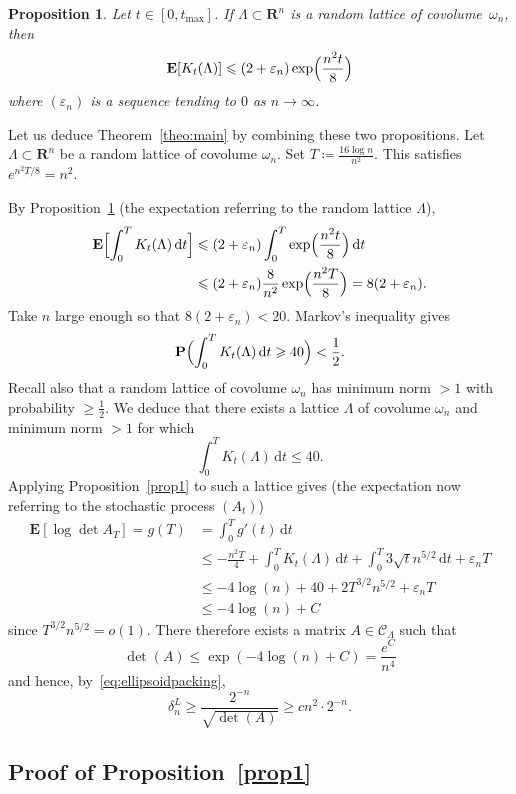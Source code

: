 \documentclass[12pt]{amsart}
\newcommand{\R}{\mathbf{R}}
\newcommand{\E}{\mathbf{E}}
\newcommand{\e}{\varepsilon}
\renewcommand{\P}{\mathbf{P}}
\renewcommand{\leq}{\leqslant}
\renewcommand{\geq}{\geqslant}
\theoremstyle{plain}
\newtheorem{proposition}{Proposition}
\theoremstyle{remark}
\begin{document}
\begin{proposition} \label{prop2}
Let $t \in [0,t_{\max}]$. If $\Lambda \subset \R^n$ is a random lattice of covolume~$\omega_n$, then
\[ \E[K_t(\Lambda)] \leq (2+\e_n) \exp \Bigl( \frac{n^2t}{8} \Bigr) \]
where $(\e_n)$ is a sequence tending to $0$ as $n \to \infty$.
\end{proposition}
 
Let us deduce Theorem~\ref{theo:main} by combining these two propositions. Let $\Lambda \subset \R^n$ be a random lattice of covolume $\omega_n$. Set $T \coloneqq \frac{16 \log n}{n^2}$. This satisfies $e^{n^2T/8}=n^2$.
 
By Proposition~\ref{prop2} (the expectation referring to the random lattice $\Lambda$),
\begin{align*} \E \Bigl[ \int_0^T K_t(\Lambda) \, \mathrm{d} t \Bigr]
& \leq  (2+\e_n) \int_0^T \exp \Bigl( \frac{n^2t}{8} \Bigr) \, \mathrm{d}t \\
& \leq  (2+\e_n) \frac{8}{n^2} \exp  \Bigl( \frac{n^2T}{8} \Bigr) = 8(2+\e_n).
\end{align*}
Take $n$ large enough so that $8(2+\e_n) < 20$. Markov's inequality gives
\[ \P \Bigl( \int_0^T K_t(\Lambda) \, \mathrm{d}t \geq 40 \Bigr) < \frac{1}{2}. \]
Recall also that a random lattice of covolume $\omega_n$ has minimum norm $>1$ with probability $\geq \frac{1}{2}$. We deduce that there exists a lattice $\Lambda$ of covolume $\omega_n$ and minimum norm $>1$ for which
\[ \int_0^T K_t(\Lambda) \,\mathrm{d}t \leq 40 .\]
Applying Proposition~\ref{prop1} to such a lattice gives (the expectation now referring to the stochastic process $(A_t)$)
\begin{align} \nonumber \E [ \log \det A_T ] = g(T) &= \int_0^T g'(t) \, \mathrm{d}t \\
\label{eq:final} & \leq  - \frac{n^2T}{4} + \int_0^T K_t(\Lambda) \, \mathrm{d}t + \int_0^T 3 \sqrt{t} n^{5/2} \, \mathrm{d}t + \e_n T \\
\nonumber & \leq  -4 \log(n) + 40 + 2 T^{3/2} n^{5/2} + \e_n T \\\nonumber & \leq   -4 \log (n) + C
\end{align}
since $T^{3/2}n^{5/2} = o(1)$. There therefore exists a matrix $A \in \mathscr{C}_\Lambda$ such that
\[ \det(A) \leq \exp( -4 \log(n) +C ) = \frac{e^C}{n^4} \]
and hence, by~\eqref{eq:ellipsoidpacking},
\[ \delta_n^L \geq \frac{2^{-n}}{\sqrt{\det(A)}} \geq c n^2 \cdot 2^{-n}.\]
 
\subsection{Proof of Proposition~\ref{prop1}}
 
\end{document}
